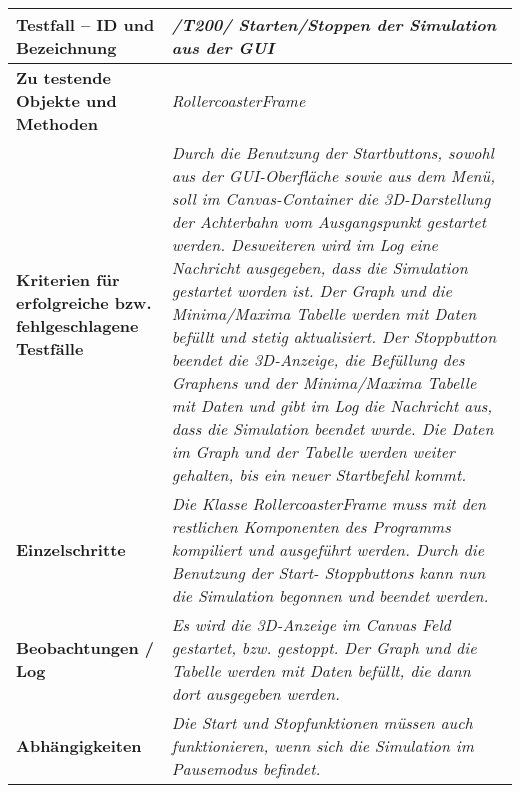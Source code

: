 \begin{longtable}{|p{7cm}|p{10cm}|}
\hline
\textbf{Testfall -- ID und Bezeichnung} &  \textit{/T200/ Starten/Stoppen der Simulation aus der GUI} \\
\hline
\textbf{Zu testende Objekte und Methoden} &  \textit{RollercoasterFrame}
\\
\hline
\textbf{Kriterien für erfolgreiche bzw. fehlgeschlagene Testfälle} &
\textit{Durch die Benutzung der Startbuttons, sowohl aus der GUI-Oberfläche sowie aus dem Menü, soll im Canvas-Container die 3D-Darstellung der Achterbahn vom Ausgangspunkt gestartet werden.
Desweiteren wird im Log eine Nachricht ausgegeben, dass die Simulation gestartet worden ist. Der Graph und die Minima/Maxima Tabelle werden mit Daten befüllt und stetig aktualisiert.
Der Stoppbutton beendet die 3D-Anzeige, die Befüllung des Graphens und der Minima/Maxima Tabelle mit Daten und gibt im Log die Nachricht aus, dass die Simulation beendet wurde. Die Daten im Graph
und der Tabelle werden weiter gehalten, bis ein neuer Startbefehl kommt.} \\
\hline
\textbf{Einzelschritte} &  \textit{Die Klasse RollercoasterFrame muss mit den restlichen Komponenten des Programms kompiliert und ausgeführt werden. Durch die Benutzung der Start- Stoppbuttons
kann nun die Simulation begonnen und beendet werden.} \\
\hline
\textbf{Beobachtungen / Log} &  \textit{Es wird die 3D-Anzeige im Canvas Feld gestartet, bzw. gestoppt. Der Graph und die Tabelle werden mit Daten befüllt, die dann dort ausgegeben werden.} \\
\hline
\textbf{Abhängigkeiten} &  \textit{Die Start und Stopfunktionen müssen auch funktionieren, wenn sich die Simulation im Pausemodus befindet.} \\
\hline
 \end{longtable}



